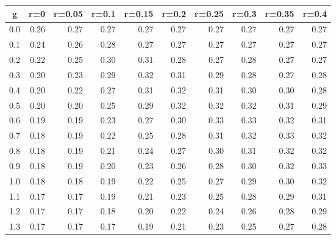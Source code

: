 %
\begin{table}[!tbp]
 \begin{center}
 \begin{tabular}{rrrrrrrrrr}\hline\hline
\multicolumn{1}{c}{g}&\multicolumn{1}{c}{r=0}&\multicolumn{1}{c}{r=0.05}&\multicolumn{1}{c}{r=0.1}&\multicolumn{1}{c}{r=0.15}&\multicolumn{1}{c}{r=0.2}&\multicolumn{1}{c}{r=0.25}&\multicolumn{1}{c}{r=0.3}&\multicolumn{1}{c}{r=0.35}&\multicolumn{1}{c}{r=0.4}\tabularnewline
\hline
0.0&0.26&0.27&0.27&0.27&0.27&0.27&0.27&0.27&0.27\tabularnewline
0.1&0.24&0.26&0.28&0.27&0.27&0.27&0.27&0.27&0.27\tabularnewline
0.2&0.22&0.25&0.30&0.31&0.28&0.27&0.28&0.27&0.27\tabularnewline
0.3&0.20&0.23&0.29&0.32&0.31&0.29&0.28&0.27&0.28\tabularnewline
0.4&0.20&0.22&0.27&0.31&0.32&0.31&0.30&0.30&0.28\tabularnewline
0.5&0.20&0.20&0.25&0.29&0.32&0.32&0.32&0.31&0.29\tabularnewline
0.6&0.19&0.19&0.23&0.27&0.30&0.33&0.33&0.32&0.31\tabularnewline
0.7&0.18&0.19&0.22&0.25&0.28&0.31&0.32&0.33&0.32\tabularnewline
0.8&0.18&0.19&0.21&0.24&0.27&0.30&0.31&0.32&0.32\tabularnewline
0.9&0.18&0.19&0.20&0.23&0.26&0.28&0.30&0.32&0.33\tabularnewline
1.0&0.18&0.18&0.19&0.22&0.25&0.27&0.29&0.30&0.32\tabularnewline
1.1&0.17&0.17&0.19&0.21&0.23&0.25&0.28&0.29&0.31\tabularnewline
1.2&0.17&0.17&0.18&0.20&0.22&0.24&0.26&0.28&0.29\tabularnewline
1.3&0.17&0.17&0.17&0.19&0.21&0.23&0.25&0.27&0.28\tabularnewline
\hline
\end{tabular}

\end{center}

\end{table}

